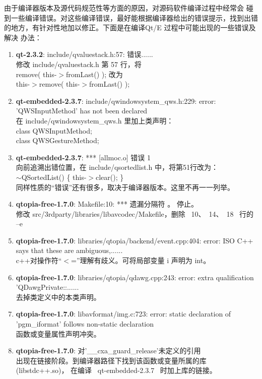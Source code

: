 	由于编译器版本及源代码规范性等方面的原因，对源码软件编译过程中经常会
碰到一些编译错误。对这些编译错误，最好能根据编译器给出的错误提示，找到出错
的地方，有针对性地加以修正。下面是在编译Qt/E 过程中可能出现的一些错误及解决
办法：
\begin{enumerate}\itemsep=-3pt
  \item {\bf qt-2.3.2}: include/qvaluestack.h:57: 错误......\\
		修改 include/qvaluestack.h 第 57 行，将\\
		remove( this-$>$fromLast() ); 改为\\
		this-$>$remove( this-$>$fromLast() );
  \item {\bf qt-embedded-2.3.7}: include/qwindowsystem\_qws.h:229: error:
		'QWSInputMethod' has not been declared\\
		在 include/qwindowsystem\_qws.h 里加上类声明：\\
		class   QWSInputMethod;\\
		class   QWSGestureMethod;
  \item {\bf qt-embedded-2.3.7}: *** [allmoc.o] 错误 1\\
		向前追溯出错位置，在 include/qsortedlist.h 中，将第51行改为：\\
		$\sim$QSortedList() \{ this-$>$clear(); \}\\
		同样性质的``错误''还有很多，取决于编译器版本。这里不再一一列举。
  \item {\bf qtopia-free-1.7.0}: Makefile:10: *** 遗漏分隔符 。 停止。\\
		修改 src/3rdparty/libraries/libavcodec/Makefile，删除 ~10、~14、~18~
		行的 --e
  \item {\bf qtopia-free-1.7.0}: libraries/qtopia/backend/event.cpp:404:
		error: ISO C++ says that these are ambiguous,......\\
		c++对操作符``$<$=''理解有歧义。可将局部变量 i 声明为 int。
  \item {\bf qtopia-free-1.7.0}: libraries/qtopia/qdawg.cpp:243: error:
		extra qualification 'QDawgPrivate::......\\
		去掉类定义中的本类声明。
  \item {\bf qtopia-free-1.7.0}: libavformat/img.c:723: error: static
		declaration of 'pgm\_iformat' follows non-static declaration\\
		函数或变量属性声明冲突。
  \item {\bf qtopia-free-1.7.0}: 对'\_\_cxa\_guard\_release'未定义的引用\\
		出现在链接阶段。到编译器路径下找到该函数或变量所属的库(libstdc++.so)，
		在编译 ~qt-embedded-2.3.7~ 时加上库的链接。
\end{enumerate}
\rm
